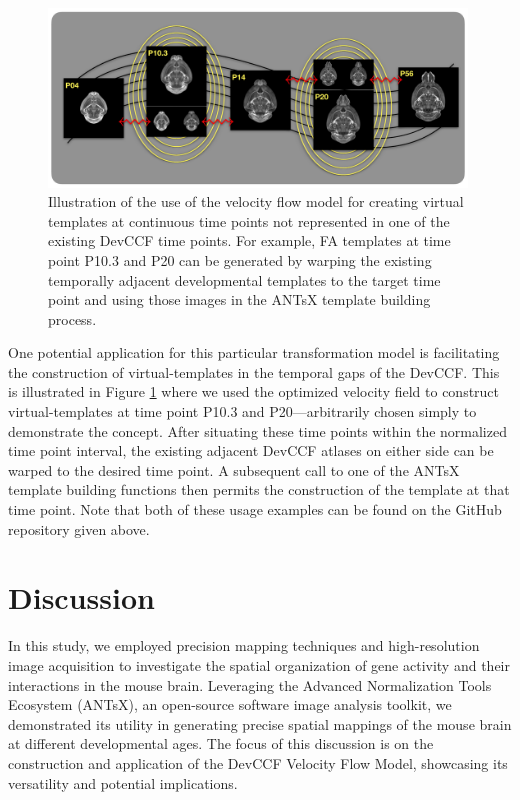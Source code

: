 \documentclass[
  12pt,
]{article}
\begin{document}
\begin{figure}[!htb]
\centering
\includegraphics[width=0.99\textwidth]{Figures/pseudo_template.pdf}
\caption{Illustration of the use of the velocity flow model for creating virtual templates
at continuous time points not represented in one of the existing DevCCF time points.
For example, FA templates at time point P10.3 and P20 can be generated by warping the 
existing temporally adjacent developmental templates to the target time point and using 
those images in the ANTsX template building process.}
\label{fig:virtual}
\end{figure}

One potential application for this particular transformation model is
facilitating the construction of virtual-templates in the temporal gaps
of the DevCCF. This is illustrated in Figure \ref{fig:virtual} where we
used the optimized velocity field to construct virtual-templates at time
point P10.3 and P20---arbitrarily chosen simply to demonstrate the
concept. After situating these time points within the normalized time
point interval, the existing adjacent DevCCF atlases on either side can
be warped to the desired time point. A subsequent call to one of the
ANTsX template building functions then permits the construction of the
template at that time point. Note that both of these usage examples can
be found on the GitHub repository given above.

\clearpage
\newpage

\hypertarget{discussion}{%
\section*{Discussion}\label{discussion}}

In this study, we employed precision mapping techniques and
high-resolution image acquisition to investigate the spatial
organization of gene activity and their interactions in the mouse brain.
Leveraging the Advanced Normalization Tools Ecosystem (ANTsX), an
open-source software image analysis toolkit, we demonstrated its utility
in generating precise spatial mappings of the mouse brain at different
developmental ages. The focus of this discussion is on the construction
and application of the DevCCF Velocity Flow Model, showcasing its
versatility and potential implications.
\end{document}
